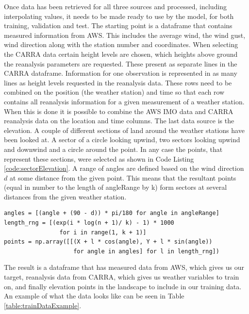 Once data has been retrieved for all three sources and processed, including interpolating values, it needs to be made ready to use by the model, for both training, validation and test. The starting point is a dataframe that contains measured information from AWS. This includes the average wind, the wind gust, wind direction along with the station number and coordinates. When selecting the CARRA data certain height levels are chosen, which heights above ground the reanalysis parameters are requested. These present as separate lines in the CARRA dataframe. Information for one observation is represented in as many lines as height levels requested in the reanalysis data. These rows need to be combined on the position (the weather station) and time so that each row contains all reanalysis information for a given measurement of a weather station. When this is done it is possible to combine the AWS IMO data and CARRA reanalysis data on the location and time columns. The last data source is the elevation. A couple of different sections of land around the weather stations have been looked at. A sector of a circle looking upwind, two sectors looking upwind and downwind and a circle around the point. In any case the points, that represent these sections, were selected as shown in Code Listing \ref{code:sectorElevation}. A range of angles are defined based on the wind direction $d$ at some distance from the given point. This means that the resultant points (equal in number to the length of angleRange by k) form sectors at several distances from the given weather station.

\begin{lstlisting}[style = Python, caption = {Sector elevation points generated}, label = code:sectorElevation]
angles = [(angle + (90 - d)) * pi/180 for angle in angleRange]
length_rng = [(exp(i * log(n + 1)/ k) - 1) * 1000 
                for i in range(1, k + 1)]
points = np.array([[(X + l * cos(angle), Y + l * sin(angle))
                    for angle in angles] for l in length_rng])   
\end{lstlisting}

The result is a dataframe that has measured data from AWS, which gives us our target, reanalysis data from CARRA, which gives us weather variables to train on, and finally elevation points in the landscape to include in our training data. An example of what the data looks like can be seen in Table \ref{table:trainDataExample}.

